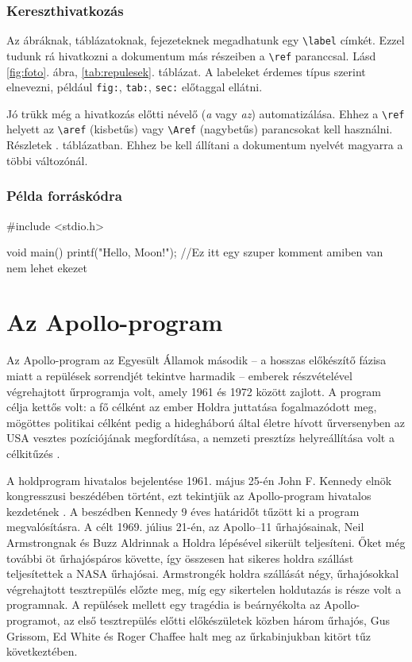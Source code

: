 \subsubsection*{Kereszthivatkozás}
Az ábráknak, táblázatoknak, fejezeteknek megadhatunk egy \verb|\label| címkét. Ezzel tudunk rá hivatkozni a dokumentum más részeiben a \verb|\ref| paranccsal. Lásd \ref{fig:foto}. ábra, \ref{tab:repulesek}. táblázat. A labeleket érdemes típus szerint elnevezni, például \verb|fig:|, \verb|tab:|, \verb|sec:| előtaggal ellátni. 

Jó trükk még a hivatkozás előtti névelő (\emph{a} vagy \emph{az}) automatizálása. Ehhez a \verb|\ref| helyett az \verb|\aref| (kisbetűs) vagy \verb|\Aref| (nagybetűs) parancsokat kell használni. Részletek . táblázatban. Ehhez be kell állítani a dokumentum nyelvét magyarra a többi változónál. 


\subsubsection*{Példa forráskódra}
\begin{ccode}
	#include <stdio.h>
	
	void main() {
		printf("Hello, Moon!"); //Ez itt egy szuper komment amiben van nem lehet ekezet
	}
\end{ccode}

\section{Az Apollo-program}

Az Apollo-program az Egyesült Államok második – a hosszas előkészítő fázisa miatt a repülések sorrendjét tekintve harmadik – emberek részvételével végrehajtott űrprogramja volt, amely 1961 és 1972 között zajlott. A program célja kettős volt: a fő célként az ember Holdra juttatása fogalmazódott meg, mögöttes politikai célként pedig a hidegháború által életre hívott űrversenyben az USA vesztes pozíciójának megfordítása, a nemzeti presztízs helyreállítása volt a célkitűzés \cite{Wettl2004}.

A holdprogram hivatalos bejelentése 1961. május 25-én John F. Kennedy elnök kongresszusi beszédében történt, ezt tekintjük az Apollo-program hivatalos kezdetének \cite{Cindy1986}. A beszédben Kennedy 9 éves határidőt tűzött ki a program megvalósításra. A célt 1969. július 21-én, az Apollo–11 űrhajósainak, Neil Armstrongnak és Buzz Aldrinnak a Holdra lépésével sikerült teljesíteni. Őket még további öt űrhajóspáros követte, így összesen hat sikeres holdra szállást teljesítettek a NASA űrhajósai. Armstrongék holdra szállását négy, űrhajósokkal végrehajtott tesztrepülés előzte meg, míg egy sikertelen holdutazás is része volt a programnak. A repülések mellett egy tragédia is beárnyékolta az Apollo-programot, az első tesztrepülés előtti előkészületek közben három űrhajós, Gus Grissom, Ed White és Roger Chaffee halt meg az űrkabinjukban kitört tűz következtében.

